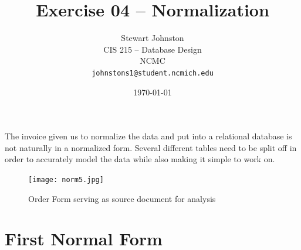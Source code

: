 \documentclass{article}
\title{Exercise 04 -- Normalization}
\author{Stewart Johnston\\
  {CIS 215 -- Database Design}\\
  {NCMC}\\
  {\texttt{johnstons1@student.ncmich.edu}}
}
\date{\today}
\begin{document}
\maketitle

The invoice given us to normalize the data and put into a relational
database is not naturally in a normalized form. Several different tables
need to be split off in order to accurately model the data while also
making it simple to work on.

\begin{figure}
	\centering
	\texttt{[image: norm5.jpg]}
	\caption{Order Form serving as source document for analysis}
\end{figure}

\section{First Normal Form}
\end{document}
